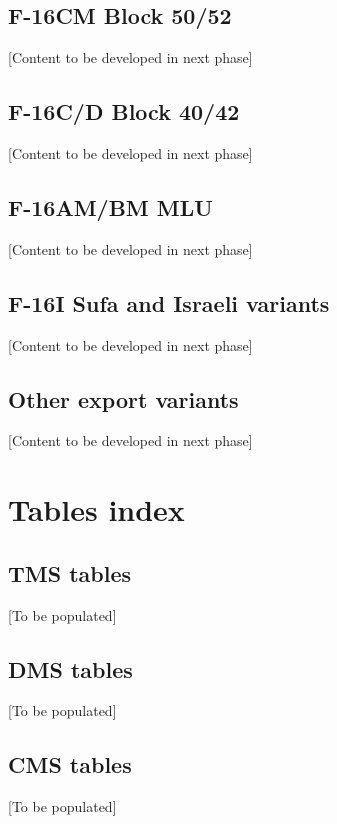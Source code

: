 \documentclass[11pt,a4paper]{article}
\begin{document}
\subsection{F-16CM Block 50/52}

[Content to be developed in next phase]

\subsection{F-16C/D Block 40/42}

[Content to be developed in next phase]

\subsection{F-16AM/BM MLU}

[Content to be developed in next phase]

\subsection{F-16I Sufa and Israeli variants}

[Content to be developed in next phase]

\subsection{Other export variants}

[Content to be developed in next phase]

\section{Tables index}

\subsection{TMS tables}

[To be populated]

\subsection{DMS tables}

[To be populated]

\subsection{CMS tables}

[To be populated]
\end{document}
